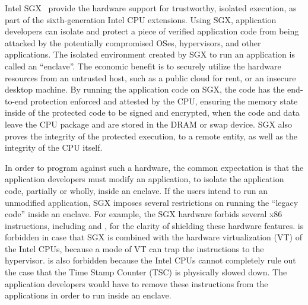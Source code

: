 Intel SGX~\cite{intelsgx} provide the hardware support for trustworthy, isolated execution, as part of the sixth-generation Intel CPU extensions.
Using SGX, application developers can isolate and protect a piece of verified application code from being attacked by the potentially compromised OSes, hypervisors, and other applications.
The isolated environment created by SGX to run an application is called an ``enclave''. The economic benefit is to securely utilize the hardware resources from an untrusted host,
such as a public cloud for rent, or an insecure desktop machine.
By running the application code on SGX, the code has the end-to-end protection enforced and attested by the CPU,
ensuring the memory state inside of the protected code
to be signed and encrypted, when the code and data leave the CPU package and are stored in the DRAM or swap device.
SGX also proves the integrity of the protected execution, to a remote entity, as well as the integrity of the CPU itself.



In order to program against such a hardware, the common expectation is that the application developers must modify an application, to isolate the application code, partially or wholly, inside an enclave.
If the users intend to run an unmodified application, SGX imposes several restrictions on running the ``legacy code'' inside an enclave.
For example, the SGX hardware forbids several x86 instructions,
including  and , for the clarity of shielding these hardware features.
 is forbidden in case that SGX is combined with the hardware virtualization (VT) of the Intel CPUs, because a mode of VT can trap the  instructions to the hypervisor.
 is also forbidden because the Intel CPUs cannot completely rule out the case that the Time Stamp Counter (TSC) is physically slowed down. 
The application developers would have to remove these instructions from the applications in order to run inside an enclave.

